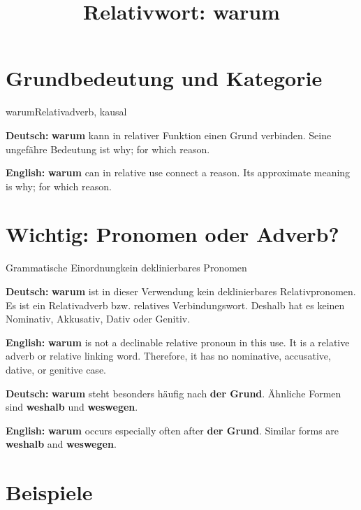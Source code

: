 \documentclass[a4paper,11pt]{article}
\title{Relativwort: \glqq warum\grqq{}}
\date{}
\newcommand{\GermanText}[1]{\textbf{Deutsch: }#1\par}
\newcommand{\EnglishText}[1]{{\small\color{SoftGray}\textbf{English: }#1\par}}
\begin{document}
\maketitle

\tableofcontents

\newpage

\section{Grundbedeutung und Kategorie}

\begin{grammarentry}{warum}{Relativadverb, kausal}

\GermanText{\textbf{warum} kann in relativer Funktion einen Grund verbinden. Seine ungefähre Bedeutung ist \glqq why; for which reason\grqq{}.}

\EnglishText{\textbf{warum} can in relative use connect a reason. Its approximate meaning is \glqq why; for which reason\grqq{}.}

\end{grammarentry}

\section{Wichtig: Pronomen oder Adverb?}

\begin{grammarentry}{Grammatische Einordnung}{kein deklinierbares Pronomen}

\GermanText{\textbf{warum} ist in dieser Verwendung kein deklinierbares Relativpronomen. Es ist ein Relativadverb bzw. relatives Verbindungswort. Deshalb hat es keinen Nominativ, Akkusativ, Dativ oder Genitiv.}

\EnglishText{\textbf{warum} is not a declinable relative pronoun in this use. It is a relative adverb or relative linking word. Therefore, it has no nominative, accusative, dative, or genitive case.}

\GermanText{\textbf{warum} steht besonders häufig nach \textbf{der Grund}. Ähnliche Formen sind \textbf{weshalb} und \textbf{weswegen}.}

\EnglishText{\textbf{warum} occurs especially often after \textbf{der Grund}. Similar forms are \textbf{weshalb} and \textbf{weswegen}.}

\end{grammarentry}

\section{Beispiele}
\end{document}
